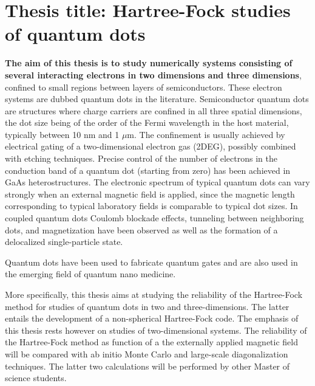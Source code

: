 \newcommand{\OP}[1]{{\bf\widehat{#1}}}

\newcommand{\be}{\begin{equation}}

\newcommand{\ee}{\end{equation}}



\pagestyle{plain}

\section*{Thesis title: Hartree-Fock studies of quantum dots}

{\bf The aim of this thesis is to study numerically systems consisting of several
interacting electrons in two dimensions and three dimensions}, confined to small regions
between layers of semiconductors. 
These electron systems
are dubbed quantum dots in the literature. 
Semiconductor quantum dots are structures where
charge carriers are confined in all three spatial dimensions, 
the dot size being of the order of the Fermi wavelength 
in the host material, typically between  10 nm and  1 $\mu$m.
The confinement is usually achieved by electrical gating of a 
two-dimensional electron gas (2DEG), 
possibly combined with etching techniques. Precise control of the
number of electrons in the conduction band of a quantum dot 
(starting from zero) has been achieved in GaAs heterostructures. 
The electronic spectrum of typical quantum dots
can vary strongly when an external magnetic field is applied, 
since the magnetic length corresponding to typical 
laboratory fields  is comparable to typical dot sizes.
In coupled quantum dots Coulomb blockade effects, 
tunneling between neighboring dots, and magnetization 
have been observed as well as the formation of a
delocalized single-particle state. 

Quantum dots have been used to fabricate  quantum gates and are also used in the emerging field
of quantum nano medicine.  

More specifically, this thesis aims at studying the reliability of the Hartree-Fock method for studies of quantum
dots in two and three-dimensions. The latter entails the development of a non-spherical Hartree-Fock code.
The emphasis of this thesis rests however on studies of two-dimensional systems.
The reliability of the Hartree-Fock method as function of a the externally applied magnetic field
will be compared with ab initio Monte Carlo and large-scale diagonalization techniques. The latter
two calculations will be performed by other Master of science students.

